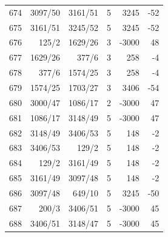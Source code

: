 \documentclass[11pt,a4paper]{article}
\begin{document}
\begin{minipage}[t]{.49\linewidth}
\begin{tabular*}{\linewidth}{@{}r@{\extracolsep{\fill}}rrrrr@{}}
674 & 3097/50 & 3161/51 & 5 & 3245 & -52\\
675 & 3161/51 & 3245/52 & 5 & 3245 & -52\\
676 & 125/2 & 1629/26 & 3 & -3000 & 48\\
677 & 1629/26 & 377/6 & 3 & 258 & -4\\
678 & 377/6 & 1574/25 & 3 & 258 & -4\\
679 & 1574/25 & 1703/27 & 3 & 3406 & -54\\
680 & 3000/47 & 1086/17 & 2 & -3000 & 47\\
681 & 1086/17 & 3148/49 & 5 & -3000 & 47\\
682 & 3148/49 & 3406/53 & 5 & 148 & -2\\
683 & 3406/53 & 129/2 & 5 & 148 & -2\\
684 & 129/2 & 3161/49 & 5 & 148 & -2\\
685 & 3161/49 & 3097/48 & 5 & 148 & -2\\
686 & 3097/48 & 649/10 & 5 & 3245 & -50\\
687 & 200/3 & 3406/51 & 5 & -3000 & 45\\
688 & 3406/51 & 3148/47 & 5 & -3000 & 45\\
\bottomrule\end{tabular*}\end{minipage}\par
\clearpage
{}\par\vspace{4pt}
\end{document}
